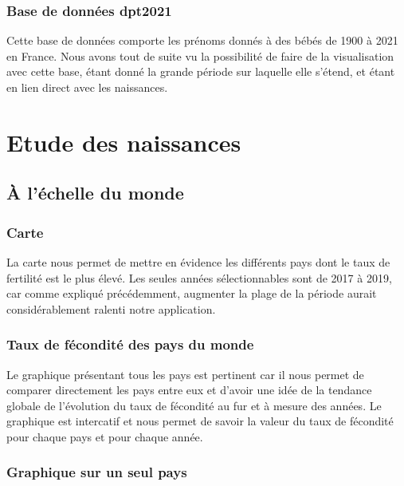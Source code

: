 \documentclass[
]{article}
\begin{document}
\hypertarget{base-de-donnuxe9es-dpt2021}{%
\subsubsection{Base de données
dpt2021}\label{base-de-donnuxe9es-dpt2021}}

Cette base de données comporte les prénoms donnés à des bébés de 1900 à
2021 en France. Nous avons tout de suite vu la possibilité de faire de
la visualisation avec cette base, étant donné la grande période sur
laquelle elle s'étend, et étant en lien direct avec les naissances.

\hypertarget{etude-des-naissances}{%
\section{Etude des naissances}\label{etude-des-naissances}}

\hypertarget{uxe0-luxe9chelle-du-monde}{%
\subsection{À l'échelle du monde}\label{uxe0-luxe9chelle-du-monde}}

\hypertarget{carte}{%
\subsubsection{Carte}\label{carte}}

La carte nous permet de mettre en évidence les différents pays dont le
taux de fertilité est le plus élevé. Les seules années sélectionnables
sont de 2017 à 2019, car comme expliqué précédemment, augmenter la plage
de la période aurait considérablement ralenti notre application.

\hypertarget{taux-de-fuxe9condituxe9-des-pays-du-monde}{%
\subsubsection{Taux de fécondité des pays du
monde}\label{taux-de-fuxe9condituxe9-des-pays-du-monde}}

Le graphique présentant tous les pays est pertinent car il nous permet
de comparer directement les pays entre eux et d'avoir une idée de la
tendance globale de l'évolution du taux de fécondité au fur et à mesure
des années. Le graphique est intercatif et nous permet de savoir la
valeur du taux de fécondité pour chaque pays et pour chaque année.

\hypertarget{graphique-sur-un-seul-pays}{%
\subsubsection{Graphique sur un seul
pays}\label{graphique-sur-un-seul-pays}}
\end{document}
